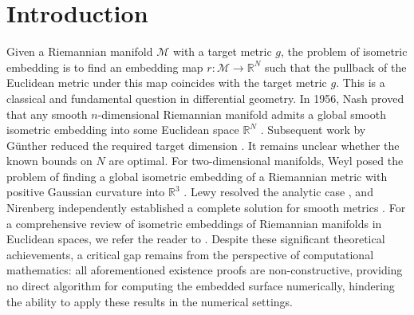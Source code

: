 \documentclass[11pt,a4paper,oneside,reqno]{amsart}
\theoremstyle{definition}
\theoremstyle{plain}
\numberwithin{theorem}{section}
\numberwithin{proposition}{section}
\numberwithin{lemma}{section}
\numberwithin{equation}{section}
\newcommand{\Man}{\mathcal{M}}
\begin{document}
\begin{abstract}
 Isometric embedding, Riemannian manifold, intrinsic curvature flow, finite element method, convergence, Regge finite element. 
\end{abstract}


\setlength\abovedisplayskip{4pt}
\setlength\belowdisplayskip{4pt}




\maketitle

\vspace{-15pt}


\setcounter{tocdepth}{1}
\tableofcontents  



\section{Introduction}

Given a Riemannian manifold \( \Man \) with a target metric \( g \), the problem of isometric embedding is to find an embedding map \( r: \Man \rightarrow \mathbb{R}^N \) such that the pullback of the Euclidean metric under this map coincides with the target metric \( g \). This is a classical and fundamental question in differential geometry.
In 1956, Nash proved that any smooth $n$-dimensional Riemannian manifold admits a global smooth isometric embedding into some Euclidean space $\mathbb{R}^N$ \cite{nash1956imbedding}. Subsequent work by Günther reduced the required target dimension \cite{Guenther1989NashEmbedding}. It remains unclear whether the known bounds on $N$ are optimal. For two-dimensional manifolds, Weyl posed the problem of finding a global isometric embedding of a Riemannian metric with positive Gaussian curvature into $\mathbb{R}^3$ \cite{Weyl1916}. Lewy resolved the analytic case \cite{Lewy1938}, and Nirenberg independently established a complete solution for smooth metrics \cite{Nirenberg1953}. For a comprehensive review of isometric embeddings of Riemannian manifolds in Euclidean spaces, we refer the reader to \cite{han2006isometric}. Despite these significant theoretical achievements, a critical gap remains from the perspective of computational mathematics: all aforementioned existence proofs are non-constructive, providing no direct algorithm for computing the embedded surface numerically, hindering the ability to apply these results in the numerical settings. 
\end{document}
